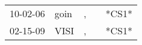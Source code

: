 \begin{supertabular}{lllll}
 10-02-06 &  goin &  , &   &  *CS1* \\
 02-15-09 &  VISI &  , &   &  *CS1* \\
\end{supertabular}

